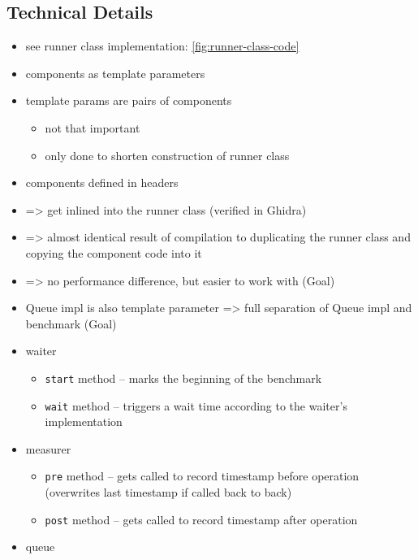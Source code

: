 \subsection{Technical Details}



\begin{itemize}
    \item see runner class implementation: \autoref{fig:runner-class-code}
    \item components as template parameters
    \item template params are pairs of components
        \begin{itemize}
            \item not that important
            \item only done to shorten construction of runner class
        \end{itemize}
    \item components defined in headers
    \item => get inlined into the runner class (verified in Ghidra)
    \item => almost identical result of compilation to duplicating the runner class and copying the component
        code into it
    \item => no performance difference, but easier to work with (Goal)
    \item Queue impl is also template parameter => full separation of Queue impl and benchmark (Goal)
    \item waiter
        \begin{itemize}
            \item \texttt{start} method -- marks the beginning of the benchmark
            \item \texttt{wait} method -- triggers a wait time according to the waiter's implementation
        \end{itemize}
    \item measurer
        \begin{itemize}
            \item \texttt{pre} method -- gets called to record timestamp before operation (overwrites last
                timestamp if called back to back)
            \item \texttt{post} method -- gets called to record timestamp after operation
        \end{itemize}
    \item queue
        \begin{itemize}

\end{itemize}
\end{itemize}
